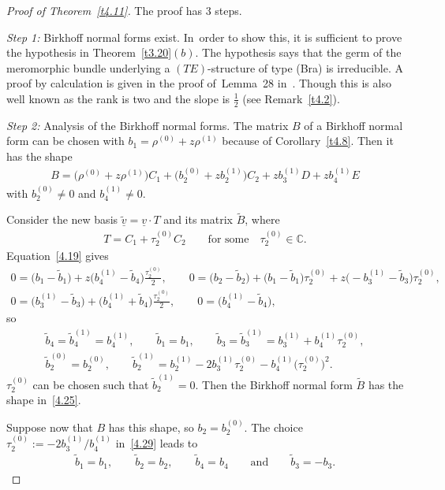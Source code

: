 \documentclass[pdftex]{sigma}%
\numberwithin{equation}{section}
\numberwithin{figure}{section}
\newcommand{\C}{{\mathbb C}}
\newcommand{\www}{\widetilde}
\newcommand{\uuuu}{\underline}
\begin{document}
\begin{proof}[Proof of Theorem~\ref{t4.11}] The proof has 3 steps.

\medskip\noindent
{\it Step 1:} Birkhoff normal forms exist. In~order to show this, it is sufficient to prove
the hypothesis in Theorem~\ref{t3.20}$(b)$.
The hypothesis says that the germ of the meromorphic
bundle underlying a $(TE)$-structure of type (Bra)
is irreducible.
A proof by calculation is given in the proof of~Lemma~28
in~\cite{DH20-3}.
Though this is also well known as the rank is two
and the slope is $\frac{1}{2}$ (see Remark~\ref{t4.2}).

\medskip\noindent
{\it Step 2:} Analysis of the Birkhoff normal forms.
The matrix $B$ of a Birkhoff normal form can be chosen
with $b_1=\rho^{(0)}+z\rho^{(1)}$ because of Corollary~\ref{t4.8}. Then it has the shape
\begin{gather*}%
B= \big(\rho^{(0)}+z\rho^{(1)}\big)C_1+\big(b_2^{(0)}+zb_2^{(1)}\big)C_2
+zb_3^{(1)}D+zb_4^{(1)}E
\end{gather*}
with $b_2^{(0)}\neq 0$ and $b_4^{(1)}\neq 0$.

Consider the new basis $\uuuu{\www v}=\uuuu{v}\cdot T$
and its matrix $\www B$, where
\begin{gather}\label{4.29}
T=C_1+\tau_2^{(0)}C_2 \qquad\text{for some}\quad \tau_2^{(0)}\in\C.
\end{gather}
Equation~\eqref{4.19} gives
\begin{gather*}
0= \big(b_1-\www b_1\big)+z\big(b_4^{(1)}-\www b_4\big)\frac{\tau_2^{(0)}}{2},
\qquad
0= \big(b_2-\www b_2\big)+\big(b_1-\www b_1\big)\tau_2^{(0)}+z\big({-}b_3^{(1)}-\www b_3\big)\tau_2^{(0)},
\\
0= \big(b_3^{(1)}-\www b_3\big)+\big(b_4^{(1)}+\www b_4\big)\frac{\tau_2^{(0)}}{2},
\qquad
0= \big(b_4^{(1)}-\www b_4\big),
\end{gather*}
so
\begin{gather}
\www b_4= \www b_4^{(1)}=b_4^{(1)},\qquad
\www b_1=b_1,\qquad
\www b_3= \www b_3^{(1)}=b_3^{(1)}+b_4^{(1)}\tau_2^{(0)},
\nonumber
\\
\www b_2^{(0)}= b_2^{(0)},\qquad
\www b_2^{(1)}= b_2^{(1)}-2b_3^{(1)}\tau_2^{(0)}-b_4^{(1)}\big(\tau_2^{(0)}\big)^2.
\label{4.30}
\end{gather}
$\tau_2^{(0)}$ can be chosen such that $\www b_2^{(1)}=0$.
Then the Birkhoff normal form $\www B$ has the shape in~\eqref{4.25}.

Suppose now that $B$ has this shape, so $b_2=b_2^{(0)}$.
The choice $\tau_2^{(0)}:=-2b_3^{(1)}/b_4^{(1)}$ in~\eqref{4.29} leads to
\begin{gather}\label{4.31}
\www b_1=b_1,\qquad
\www b_2=b_2,\qquad
\www b_4=b_4\qquad\text{and}\qquad
\www b_3=-b_3.
\end{gather}


\end{proof}
\end{document}
